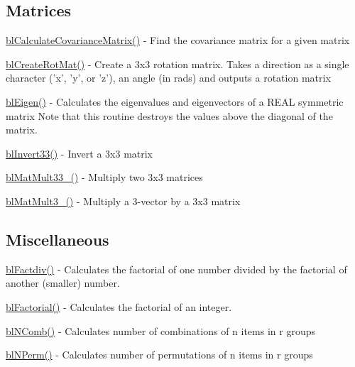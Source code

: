\subsection*{Matrices }


\begin{DoxyItemize}
\item \hyperlink{regression_8c_a7ecef8a6ff090f41bb8b78e526c7b1c0}{bl\-Calculate\-Covariance\-Matrix()} -\/ Find the covariance matrix for a given matrix
\item \hyperlink{_create_rot_mat_8c_a889ddf79e2c922e8c6d2905ee8ae163b}{bl\-Create\-Rot\-Mat()} -\/ Create a 3x3 rotation matrix. Takes a direction as a single character ('x', 'y', or 'z'), an angle (in rads) and outputs a rotation matrix
\item \hyperlink{eigen_8c_aff275dac2e154d79b964066c31fd1be1}{bl\-Eigen()} -\/ Calculates the eigenvalues and eigenvectors of a R\-E\-A\-L symmetric matrix Note that this routine destroys the values above the diagonal of the matrix.
\item \hyperlink{invert33_8c_ac6636fdfdbd575b5c1309f5fe5ce11c2}{bl\-Invert33()} -\/ Invert a 3x3 matrix
\item \hyperlink{_mat_mult33__33_8c_a022074db4fea512661f861a76ff61649}{bl\-Mat\-Mult33\-\_()} -\/ Multiply two 3x3 matrices
\item \hyperlink{_mat_mult3__33_8c_a38c36311ce82e6d103c7a8d4ae398fd1}{bl\-Mat\-Mult3\-\_()} -\/ Multiply a 3-\/vector by a 3x3 matrix
\end{DoxyItemize}

\subsection*{Miscellaneous }


\begin{DoxyItemize}
\item \hyperlink{factdiv_8c_adfed83e4c2306e2fe6caac25651e5391}{bl\-Factdiv()} -\/ Calculates the factorial of one number divided by the factorial of another (smaller) number.
\item \hyperlink{factorial_8c_abca90ab73d789494132fac8c76ccc461}{bl\-Factorial()} -\/ Calculates the factorial of an integer.
\item \hyperlink{_math_util_8h_a5231f7d17925927da83f3bc2b2e43f6c}{bl\-N\-Comb()} -\/ Calculates number of combinations of n items in r groups
\item \hyperlink{_math_util_8h_aeedda0f6840d485f123a8694494f83ee}{bl\-N\-Perm()} -\/ Calculates number of permutations of n items in r groups
\end{DoxyItemize}

